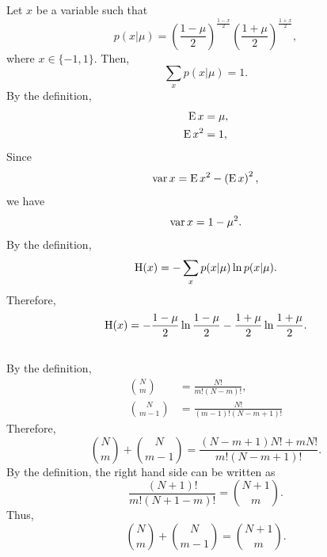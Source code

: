 \subsection{}
\label{2.2}
Let $x$ be a variable such that
%
\begin{equation}
p(x | \mu) 
= 
\left( 
	\frac{1 - \mu}{2} 
\right) ^ \frac{1 - x}{2} 
\left( 
	\frac{1 + \mu}{2} 
\right) ^ \frac{1 + x}{2},
\end{equation}
%
where $x \in \{ -1, 1 \}$.
Then,
%
\begin{equation}
\sum_{x} 
p(x | \mu) 
= 
1.
\end{equation}
%
By the definition,
%
\begin{equation}
\begin{aligned}
\operatorname{E} x 
&= 
\mu, 
\\
\operatorname{E} x ^ 2 
&= 
1,
\end{aligned}
\end{equation}
%
Since
%
\begin{equation}
\operatorname{var} x 
= 
\operatorname{E} x ^ 2 
- 
\left( 
	\operatorname{E} x 
\right) ^ 2,
\end{equation}
%
we have
%
\begin{equation}
\operatorname{var} x 
= 
1 
- 
\mu ^ 2.
\end{equation}
%
By the definition,
%
\begin{equation}
{\rm H}(x) 
= 
- 
\sum_{x} 
p(x | \mu) 
\ln p(x | \mu).
\end{equation}
%
Therefore,
%
\begin{equation}
{\rm H} (x) 
= 
- 
\frac{1 - \mu}{2} 
\ln \frac{1 - \mu}{2} 
- 
\frac{1 + \mu}{2} 
\ln \frac{1 + \mu}{2}.
\end{equation}
%


\subsection{}
\label{2.3}
By the definition,
%
\begin{equation}
\begin{aligned}
{N \choose m} 
&= 
\frac{N!}{m! (N - m)!}, 
\\
{N \choose m - 1} 
&= 
\frac{N!}{(m - 1)! (N - m + 1)!}
\end{aligned}
\end{equation}
%
Therefore,
%
\begin{equation}
{N \choose m} 
+ 
{N \choose m - 1} 
= 
\frac{(N - m + 1) N! + m N!}{m! (N - m + 1)!}.
\end{equation}
%
By the definition, the right hand side can be written as
%
\begin{equation}
\frac{(N + 1)!}{m! (N + 1 - m)!} 
= 
{N + 1 \choose m}.
\end{equation}
%
Thus,
%
\begin{equation}
{N \choose m} 
+ 
{N \choose m - 1} 
= 
{N + 1 \choose m}.
\end{equation}
%

